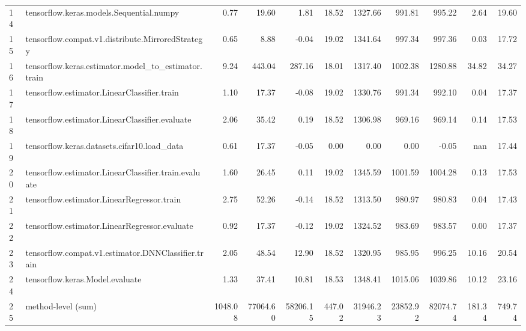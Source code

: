 \begin{tabular}{llrrrrrrrrr}
14 & tensorflow.keras.models.Sequential.numpy & 0.77 & 19.60 & 1.81 & 18.52 & 1327.66 & 991.81 & 995.22 & 2.64 & 19.60 \\
15 & tensorflow.compat.v1.distribute.MirroredStrategy & 0.65 & 8.88 & -0.04 & 19.02 & 1341.64 & 997.34 & 997.36 & 0.03 & 17.72 \\
16 & tensorflow.keras.estimator.model_to_estimator.train & 9.24 & 443.04 & 287.16 & 18.01 & 1317.40 & 1002.38 & 1280.88 & 34.82 & 34.27 \\
17 & tensorflow.estimator.LinearClassifier.train & 1.10 & 17.37 & -0.08 & 19.02 & 1330.76 & 991.34 & 992.10 & 0.04 & 17.37 \\
18 & tensorflow.estimator.LinearClassifier.evaluate & 2.06 & 35.42 & 0.19 & 18.52 & 1306.98 & 969.16 & 969.14 & 0.14 & 17.53 \\
19 & tensorflow.keras.datasets.cifar10.load_data & 0.61 & 17.37 & -0.05 & 0.00 & 0.00 & 0.00 & -0.05 & nan & 17.44 \\
20 & tensorflow.estimator.LinearClassifier.train.evaluate & 1.60 & 26.45 & 0.11 & 19.02 & 1345.59 & 1001.59 & 1004.28 & 0.13 & 17.53 \\
21 & tensorflow.estimator.LinearRegressor.train & 2.75 & 52.26 & -0.14 & 18.52 & 1313.50 & 980.97 & 980.83 & 0.04 & 17.43 \\
22 & tensorflow.estimator.LinearRegressor.evaluate & 0.92 & 17.37 & -0.12 & 19.02 & 1324.52 & 983.69 & 983.57 & 0.00 & 17.37 \\
23 & tensorflow.compat.v1.estimator.DNNClassifier.train & 2.05 & 48.54 & 12.90 & 18.52 & 1320.95 & 985.95 & 996.25 & 10.16 & 20.54 \\
24 & tensorflow.keras.Model.evaluate & 1.33 & 37.41 & 10.81 & 18.53 & 1348.41 & 1015.06 & 1039.86 & 10.12 & 23.16 \\
25 & method-level (sum) & 1048.08 & 77064.60 & 58206.15 & 447.02 & 31946.23 & 23852.92 & 82074.74 & 181.34 & 749.74 \\
\end{tabular}
